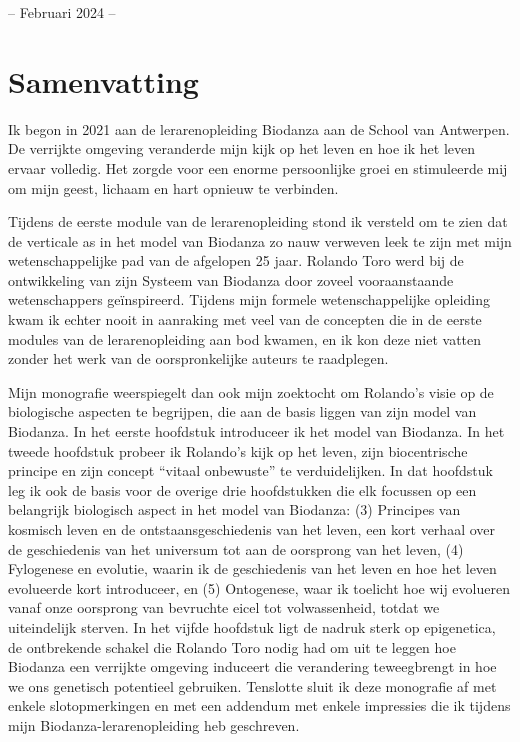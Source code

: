 \documentclass[
  11pt,
]{book}
\begin{document}
-- Februari 2024 --

\chapter*{Samenvatting}\label{samenvatting}

Ik begon in 2021 aan de lerarenopleiding Biodanza aan de School van Antwerpen. De verrijkte omgeving veranderde mijn kijk op het leven en hoe ik het leven ervaar volledig. Het zorgde voor een enorme persoonlijke groei en stimuleerde mij om mijn geest, lichaam en hart opnieuw te verbinden.

Tijdens de eerste module van de lerarenopleiding stond ik versteld om te zien dat de verticale as in het model van Biodanza zo nauw verweven leek te zijn met mijn wetenschappelijke pad van de afgelopen 25 jaar. Rolando Toro werd bij de ontwikkeling van zijn Systeem van Biodanza door zoveel vooraanstaande wetenschappers geïnspireerd. Tijdens mijn formele wetenschappelijke opleiding kwam ik echter nooit in aanraking met veel van de concepten die in de eerste modules van de lerarenopleiding aan bod kwamen, en ik kon deze niet vatten zonder het werk van de oorspronkelijke auteurs te raadplegen.

Mijn monografie weerspiegelt dan ook mijn zoektocht om Rolando's visie op de biologische aspecten te begrijpen, die aan de basis liggen van zijn model van Biodanza. In het eerste hoofdstuk introduceer ik het model van Biodanza. In het tweede hoofdstuk probeer ik Rolando's kijk op het leven, zijn biocentrische principe en zijn concept ``vitaal onbewuste'' te verduidelijken. In dat hoofdstuk leg ik ook de basis voor de overige drie hoofdstukken die elk focussen op een belangrijk biologisch aspect in het model van Biodanza: (3) Principes van kosmisch leven en de ontstaansgeschiedenis van het leven, een kort verhaal over de geschiedenis van het universum tot aan de oorsprong van het leven, (4) Fylogenese en evolutie, waarin ik de geschiedenis van het leven en hoe het leven evolueerde kort introduceer, en (5) Ontogenese, waar ik toelicht hoe wij evolueren vanaf onze oorsprong van bevruchte eicel tot volwassenheid, totdat we uiteindelijk sterven. In het vijfde hoofdstuk ligt de nadruk sterk op epigenetica, de ontbrekende schakel die Rolando Toro nodig had om uit te leggen hoe Biodanza een verrijkte omgeving induceert die verandering teweegbrengt in hoe we ons genetisch potentieel gebruiken. Tenslotte sluit ik deze monografie af met enkele slotopmerkingen en met een addendum met enkele impressies die ik tijdens mijn Biodanza-lerarenopleiding heb geschreven.
\end{document}
